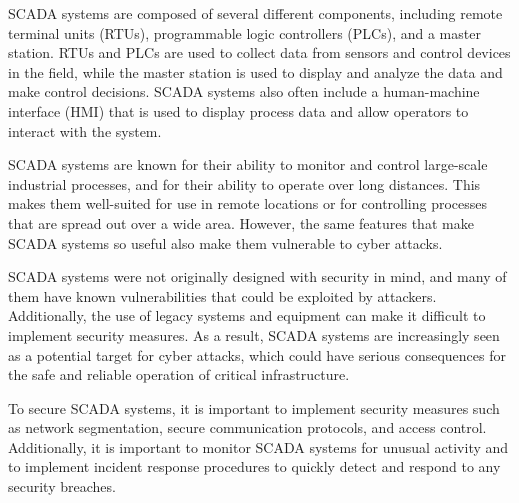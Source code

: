 SCADA systems are composed of several different components, including remote terminal units (RTUs), programmable logic controllers (PLCs), and a master station. RTUs and PLCs are used to collect data from sensors and control devices in the field, while the master station is used to display and analyze the data and make control decisions. SCADA systems also often include a human-machine interface (HMI) that is used to display process data and allow operators to interact with the system.

SCADA systems are known for their ability to monitor and control large-scale industrial processes, and for their ability to operate over long distances. This makes them well-suited for use in remote locations or for controlling processes that are spread out over a wide area. However, the same features that make SCADA systems so useful also make them vulnerable to cyber attacks.

SCADA systems were not originally designed with security in mind, and many of them have known vulnerabilities that could be exploited by attackers. Additionally, the use of legacy systems and equipment can make it difficult to implement security measures. As a result, SCADA systems are increasingly seen as a potential target for cyber attacks, which could have serious consequences for the safe and reliable operation of critical infrastructure.

To secure SCADA systems, it is important to implement security measures such as network segmentation, secure communication protocols, and access control. Additionally, it is important to monitor SCADA systems for unusual activity and to implement incident response procedures to quickly detect and respond to any security breaches.

